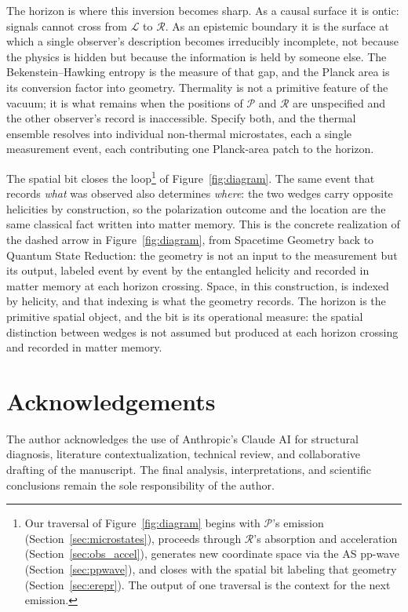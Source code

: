 \documentclass[12pt,a4paper]{article}
\begin{document}
The horizon is where this inversion becomes sharp. As a 
causal surface it is ontic: signals cannot cross from 
$\mathcal{L}$ to $\mathcal{R}$. As an epistemic boundary 
it is the surface at which a single observer's description 
becomes irreducibly incomplete,  not because the physics 
is hidden but because the information is held by someone 
else. The Bekenstein--Hawking entropy is the measure of 
that gap, and the Planck area is its conversion factor 
into geometry.
Thermality is not a primitive feature of 
the vacuum; it is what remains when the positions of 
$\mathcal{P}$ and $\mathcal{R}$ are unspecified and
the other observer's record is inaccessible.
Specify both, and the thermal 
ensemble resolves into individual non-thermal microstates, 
each a single measurement event, each contributing one 
Planck-area patch to the horizon.

The spatial bit closes the loop\footnote{
  Our traversal of Figure~\ref{fig:diagram} 
  begins with $\mathcal{P}$'s emission (Section~\ref{sec:microstates}), 
  proceeds through $\mathcal{R}$'s absorption and acceleration 
  (Section~\ref{sec:obs_accel}), generates new coordinate space 
  via the AS pp-wave (Section~\ref{sec:ppwave}), and closes 
  with the spatial bit labeling that geometry 
  (Section~\ref{sec:erepr}). The output of one traversal 
  is the context for the next emission.}
of Figure~\ref{fig:diagram}. 
The same event that records \emph{what} was observed also 
determines \emph{where}: the two wedges carry opposite 
helicities by construction, so the polarization outcome 
and the location are the same classical fact written into 
matter memory. This is the concrete realization of the 
dashed arrow in Figure~\ref{fig:diagram}, from Spacetime 
Geometry back to Quantum State Reduction: the geometry 
is not an input to the measurement but its output, 
labeled event by event by the entangled helicity and 
recorded in matter memory at each horizon crossing. 
Space, in this construction, is indexed by helicity, 
and that indexing is what the geometry records. 
The horizon is the primitive spatial object, 
and the bit is its operational measure: the spatial 
distinction between wedges is not assumed but produced 
at each horizon crossing and recorded in matter memory.


\section {Acknowledgements}
The author acknowledges the use of Anthropic's Claude AI 
for structural diagnosis, literature 
contextualization, technical review, and collaborative 
drafting of the manuscript. The final analysis, 
interpretations, and scientific conclusions remain the 
sole responsibility of the author.
\end{document}
